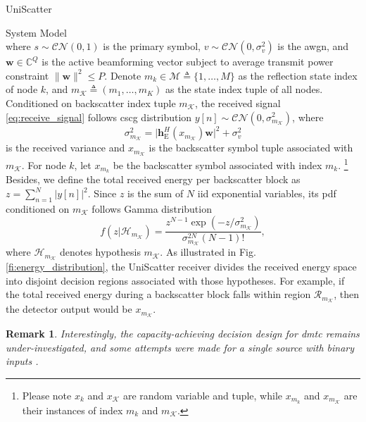 \documentclass[journal]{IEEEtran}
\newtheorem{remark}{Remark}
\begin{document}
\begin{section}{UniScatter}
\begin{subsection}{System Model}
\begin{equation}
			\label{eq:receive_signal}
		\end{equation}
		where $s \sim \mathcal{CN}(0,1)$ is the primary symbol, $v \sim \mathcal{CN}(0,\sigma_v^2)$ is the \gls{awgn}, and $\boldsymbol{w} \in \mathbb{C}^{Q}$ is the active beamforming vector subject to average transmit power constraint $\lVert \boldsymbol{w} \rVert^2 \le P$.
		Denote $m_k \in \mathcal{M} \triangleq \{1,\ldots,M\}$ as the reflection state index of node $k$, and $m_{\mathcal{K}} \triangleq (m_1,\ldots,m_K)$ as the state index tuple of all nodes.
		Conditioned on backscatter index tuple $m_{\mathcal{K}}$, the received signal \eqref{eq:receive_signal} follows \gls{cscg} distribution $y[n] \sim \mathcal{CN}(0,\sigma_{m_{\mathcal{K}}}^2)$, where
		\begin{equation}
			\sigma_{m_{\mathcal{K}}}^2 = \lvert \boldsymbol{h}_{\mathrm{E}}^H(x_{m_{\mathcal{K}}}) \boldsymbol{w} \rvert^2 + \sigma_v^2
			\label{eq:receive_variance}
		\end{equation}
		is the received variance and $x_{m_\mathcal{K}}$ is the backscatter symbol tuple associated with $m_{\mathcal{K}}$.
		For node $k$, let $x_{m_k}$ be the backscatter symbol associated with index $m_k$.%
		\footnote{
			Please note $x_k$ and $x_{\mathcal{K}}$ are random variable and tuple, while $x_{m_k}$ and $x_{m_{\mathcal{K}}}$ are their instances of index $m_k$ and $m_{\mathcal{K}}$.
		}
		Besides, we define the total received energy per backscatter block as $z=\sum_{n=1}^N \lvert y[n] \rvert^2$.
		Since $z$ is the sum of $N$ \gls{iid} exponential variables, its \gls{pdf} conditioned on $m_{\mathcal{K}}$ follows Gamma distribution
		\begin{equation}
			f(z|\mathcal{H}_{m_{\mathcal{K}}}) = \frac{z^{N-1} \exp(-z/\sigma_{m_{\mathcal{K}}}^2)}{\sigma_{m_{\mathcal{K}}}^{2N} (N-1)!},
			\label{eq:energy_distribution}
		\end{equation}
		where $\mathcal{H}_{m_{\mathcal{K}}}$ denotes hypothesis $m_{\mathcal{K}}$.
		As illustrated in Fig. \ref{fi:energy_distribution}, the UniScatter receiver divides the received energy space into disjoint decision regions associated with those hypotheses.
		For example, if the total received energy during a backscatter block falls within region $\mathcal{R}_{m_{\mathcal{K}}}$, then the detector output would be $x_{m_{\mathcal{K}}}$.
		\begin{remark}
			Interestingly, the capacity-achieving decision design for \gls{dmtc} remains under-investigated, and some attempts were made for a single source with binary inputs \cite{Qian2019b,Nguyen2021b}.

\end{remark}
\end{subsection}
\end{section}
\end{document}

